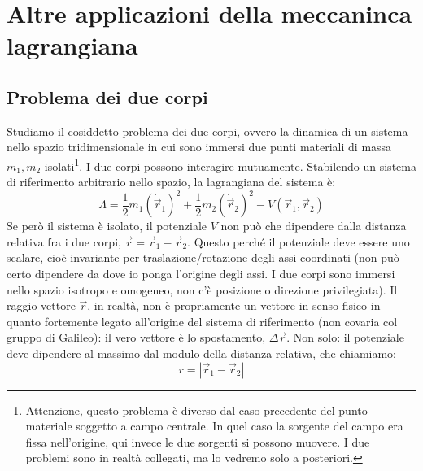 \documentclass[a4paper,openany]{article}
\begin{document}
	\section{Altre applicazioni della meccaninca lagrangiana}
	\subsection{Problema dei due corpi}
	Studiamo il cosiddetto problema dei due corpi, ovvero la dinamica di un sistema nello spazio tridimensionale in cui sono immersi due punti materiali di massa $m_1, m_2$ isolati\footnote{Attenzione, questo problema è diverso dal caso precedente del punto materiale soggetto a campo centrale. In quel caso la sorgente del campo era fissa nell'origine, qui invece le due sorgenti si possono muovere. I due problemi sono in realtà collegati, ma lo vedremo solo a posteriori.}. I due corpi possono interagire mutuamente. Stabilendo un sistema di riferimento arbitrario nello spazio, la lagrangiana del sistema è:
	\begin{equation}\label{key}
		\Lambda=  \dfrac{1}{2}m_1(\dot{\vec{r}}_{1})^{2} + \dfrac{1}{2}m_2(\dot{\vec{r}}_{2})^{2} - V(\vec{r}_1,\vec{r}_2)
	\end{equation}
	Se però il sistema è isolato, il potenziale $V$ non può che dipendere dalla distanza relativa fra i due corpi, $ \vec{r} = \vec{r}_1-\vec{r}_2 $. Questo perché il potenziale deve essere uno scalare, cioè invariante per traslazione/rotazione degli assi coordinati (non può certo dipendere da dove io ponga l'origine degli assi. I due corpi sono immersi nello spazio isotropo e omogeneo, non c'è posizione o direzione privilegiata). Il raggio vettore $\vec{r}$, in realtà, non è propriamente un vettore in senso fisico in quanto fortemente legato all'origine del sistema di riferimento (non covaria col gruppo di Galileo): il vero vettore è lo spostamento, $\Delta \vec{r}$. Non solo: il potenziale deve dipendere al massimo dal modulo della distanza relativa, che chiamiamo:
	$$
	r = |\vec{r}_1-\vec{r}_2|
	$$
	
\end{document}
